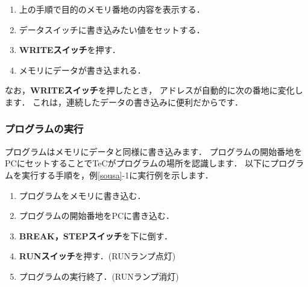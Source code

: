 \begin{enumerate}
\item 上の手順で目的のメモリ番地の内容を表示する．
\item データスイッチに書き込みたい値をセットする．
\item {\bf WRITEスイッチ}を押す．
\item メモリにデータが書き込まれる．
\end{enumerate}

なお，{\bf WRITEスイッチ}を押したとき，
アドレスが自動的に次の番地に変化します．
これは，連続したデータの書き込みに便利だからです．

\subsubsection{プログラムの実行}



プログラムはメモリにデータと同様に書き込みます．
プログラムの開始番地をPCにセットすることでTeCがプログラムの場所を認識します．
以下にプログラムを実行する手順を，例\ref{sousa}-1に実行例を示します．

\begin{enumerate}
\item プログラムをメモリに書き込む．
\item プログラムの開始番地をPCに書き込む．
\item {\bf BREAK，STEPスイッチ}を下に倒す．
\item {\bf RUNスイッチ}を押す．(RUNランプ点灯)
\item プログラムの実行終了．(RUNランプ消灯)
\end{enumerate}

